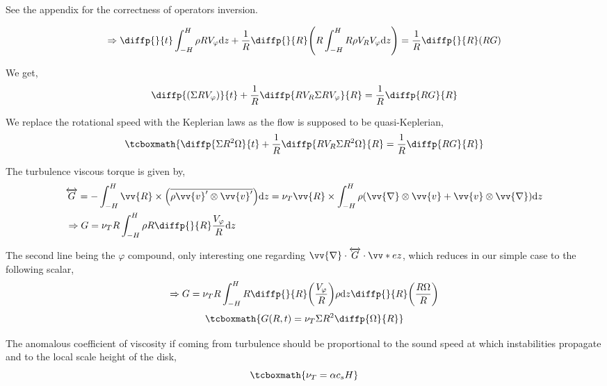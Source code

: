 \documentclass[10pt,a4paper,english]{article}
\let\originalleft\left
\let\originalright\right
\renewcommand{\left}{\mathopen{}\mathclose\bgroup\originalleft}
\renewcommand{\right}{\aftergroup\egroup\originalright}
\begin{document}
See the appendix for the correctness of operators inversion.


\begin{equation*}
    \Rightarrow \diffp{}{t} \int_{-H}^H \rho R V_\varphi \d{z} + \frac{1}{R} \diffp{}{R} \left( R \int_{-H}^H R \rho V_R V_\varphi \d{z} \right) =
    \frac{1}{R} \diffp{}{R} \left( R G \right)
\end{equation*}

We get,
\begin{equation*}
    \diffp{\left(\Sigma R V_\varphi\right)}{t} + \frac{1}{R} \diffp{R V_R \Sigma R V_\varphi}{R} = \frac{1}{R} \diffp{RG}{R}
\end{equation*}

We replace the rotational speed with the Keplerian laws as the flow is supposed
to be quasi-Keplerian,
\begin{equation}
    \label{eq:alpha_moment}
    \tcboxmath{
        \diffp{\Sigma R^2 \Omega}{t} + \frac{1}{R} \diffp{R V_R \Sigma R^2 \Omega}{R} = \frac{1}{R} \diffp{RG}{R}
    }
\end{equation}

The turbulence viscous torque is given by,
\begin{align*}
    & \overleftrightarrow{G} = - \int_{-H}^H \vv{R} \times \left( \overline{\rho \vv{v}' \otimes \vv{v}'} \right) \d{z} =
    \nu_T \vv{R} \times \int_{-H}^H \rho \left(\vv{\nabla} \otimes \vv{v} + \vv{v} \otimes \vv{\nabla} \right) \d{z} \\
    & \Rightarrow G = \nu_T R \int_{-H}^{H} \rho R \diffp{}{R} \frac{V_\varphi}{R} \d{z}
\end{align*}

The second line being the $\varphi$ compound, only interesting one regarding
$\vv{\nabla} \cdot \overleftrightarrow{G} \cdot \vv*{e}{z}$, which reduces in
our simple case to the following scalar,
\begin{equation*}
    \Rightarrow G = \nu_T R \int_{-H}^H R \diffp{}{R} \left( \frac{V_\varphi}{R} \right) \rho \d{z} \diffp{}{R} \left(\frac{R \Omega}{R}\right)
\end{equation*}
\begin{equation}
    \tcboxmath{
        G(R,t) = \nu_T \Sigma R^2 \diffp{\Omega}{R}
    }
\end{equation}

The anomalous coefficient of viscosity if coming from turbulence should be
proportional to the sound speed at which instabilities propagate and to the
local scale height of the disk,
\begin{equation}
    \tcboxmath{
        \nu_T = \alpha c_s H
    }
\end{equation}
\end{document}
